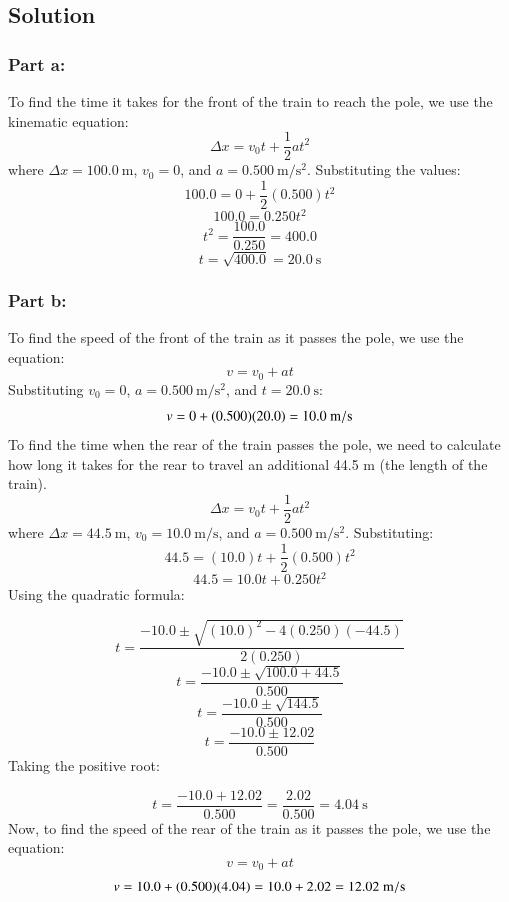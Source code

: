 \documentclass{article}
\begin{document}
\subsection*{Solution}

\subsubsection*{Part a:}
To find the time it takes for the front of the train to reach the pole, we use the kinematic equation:
\[
    \Delta x = v_0 t + \frac{1}{2} a t^2
\]
where $\Delta x = 100.0\ \unit{\meter}$, $v_0 = 0$, and $a = 0.500\ \unit{\meter\per\second^2}$. Substituting the values:
\[
    100.0 = 0 + \frac{1}{2}(0.500)t^2
\]
\[
    100.0 = 0.250 t^2
\]
\[
    t^2 = \frac{100.0}{0.250} = 400.0
\]
\[
    t = \sqrt{400.0} = 20.0\ \unit{\second}
\]

\subsubsection*{Part b:}
To find the speed of the front of the train as it passes the pole, we use the equation:
\[
    v = v_0 + at
\]
Substituting $v_0 = 0$, $a = 0.500\ \unit{\meter\per\second^2}$, and $t = 20.0\ \unit{\second}$:
\[
	v = 0 + (0.500)(20.0) = 10.0\ \unit{{\meter\per\second}}
\]
To find the time when the rear of the train passes the pole, we need to calculate how long it takes for the rear to travel an additional 44.5 m (the length of the train).
\[
    \Delta x = v_0 t + \frac{1}{2} a t^2
\]
where $\Delta x = 44.5\ \unit{\meter}$, $v_0 = 10.0\ \unit{\meter\per\second}$, and $a = 0.500\ \unit{\meter\per\second^2}$. Substituting:
\[
    44.5 = (10.0)t + \frac{1}{2}(0.500)t^2
\]
\[
    44.5 = 10.0t + 0.250t^2
\]
Using the quadratic formula:

\[
    t = \frac{-10.0 \pm \sqrt{(10.0)^2 - 4(0.250)(-44.5)}}{2(0.250)}
\]
\[
    t = \frac{-10.0 \pm \sqrt{100.0 + 44.5}}{0.500}
\]
\[
    t = \frac{-10.0 \pm \sqrt{144.5}}{0.500}
\]
\[
    t = \frac{-10.0 \pm 12.02}{0.500}
\]
Taking the positive root:

\[
    t = \frac{-10.0 + 12.02}{0.500} = \frac{2.02}{0.500} = 4.04\ \unit{\second}
\]
Now, to find the speed of the rear of the train as it passes the pole, we use the equation:
\[
    v = v_0 + at
\]
\[
v = 10.0 + (0.500)(4.04) = 10.0 + 2.02 = 12.02\ \unit{{\meter\per\second}}
\]
\end{document}
